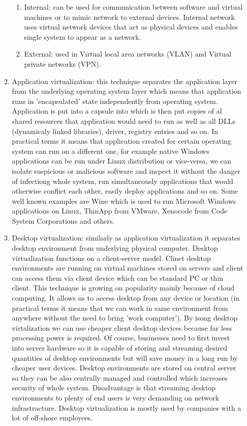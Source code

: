 \begin{enumerate}
\begin{enumerate}
\begin{enumerate}
\item Internal: can be used for communication between software and virtual machines or to mimic network to external devices. Internal network uses virtual network devices that act as physical devices and enables single system to appear as a network.

\item External: used in Virtual local area networks (VLAN) and Virtual private networks (VPN).
\end{enumerate}

\item Application virtualization: this technique separates the application layer from the underlying operating system layer which means that application runs in 'encapsulated' state independently from operating system. Application is put into a capsule into which is then put copies of al shared resources that application would need to run as well as all DLLs (dynamicaly linked libraries), driver, registry entries and so on. In practical terms it means that application created for certain operating system can run on a different one, for example native Windows applications can be run under Linux distribution or vice-versa, we can isolate suspicious or malicious software and inspect it without the danger of infectiong whole system, run simultaneously applications that would otherwise conflict each other, easily deploy applications and so on. Some well known examples are Wine which is used to run Microsoft Windows applications on Linux, ThinApp from VMware, Xenocode from Code System Corporations and others.

\item Desktop virtualization: similarly as application virtualization it separates desktop environment from underlying physical computer. Desktop virtualization functions on a client-server model. Clinet desktop environments are running on virtual machines stored on servers and client can access them via client device which can be standard PC or thin client. This technique is growing on popularity mainly because of cloud computing. It allows us to access desktop from any device or location (in practical terms it means that we can work in same environment from anywhere without the need to bring 'work computer'). By isong desktop virtalization we can use cheaper client desktop devices because far less processing power is required. Of course, businesses need to first invest into server hardware so it is capable of storing and streaming desired quantities of desktop environments but will save money in a long run by cheaper user devices. Desktop environments are stored on central server so they can be also centrally managed and controlled which increases security of whole system. Disadvantage is that streaming desktop environments to plenty of end users is very demanding on network infrastracture. Desktop virtualization is mostly used by companies with a lot of off-shore employees.


\end{enumerate}
\end{enumerate}
